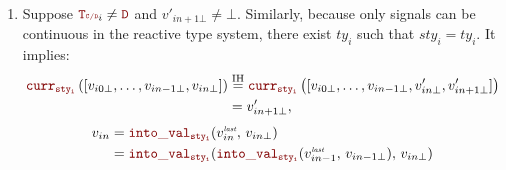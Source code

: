 \begin{skippableproof}
\begin{itemize}
\begin{enumerate}
\begin{align*}
                                                                                          & \qquad \text{\cf \Cref{lem:semantics:grfrp:theorems:oversampling:CurrVal:last}},
                        \end{align*}
                        then:
                        \begin{align*}
                            v'_{in+1} & = \intoVal{ty_i}{v'_{in}}{v'_{in+1\bot}}                               \\
                                      & = \intoVal{ty_i}{v'_{in}}{\bot}                                        \\
                                      & = \intoVal{ty_i}{\intoVal{ty_i}{v_{in}^{\explast}}{v'_{in\bot}}}{\bot} \\
                                      & = \intoVal{ty_i}{\intoVal{ty_i}{v_{in}^{\explast}}{v_{in\bot}}}{\bot}  \\
                                      & = \intoVal{ty_i}{v_{in}^{\explast}}{v_{in\bot}}                        \\
                                      & \qquad \text{\cf \Cref{rule:semantics:grfrp:opsem:aux:intoVal:signal}} \\
                                      & = v_{in}.
                        \end{align*}
                  \item Suppose $\rType_i \neq \dType$ and $v'_{in+1\bot} \neq \bot$. Similarly,
                        because only signals can be continuous in the reactive type system, there
                        exist $ty_i$ such that $sty_i = ty_i$. It implies:
                        \begin{align*}
                            \CurrVal{sty_i}{[v_{i0\bot}, \dots, v_{in-1\bot}, v_{in\bot}]} & \myeq{IH} \CurrVal{sty_i}{[v_{i0\bot}, \dots, v_{in-1\bot}, v'_{in\bot}, v'_{in+1\bot}]} \\
                                                                                           & = v'_{in+1\bot},
                        \end{align*}
                        \begin{align*}
                            v_{in} & = \intoVal{sty_i}{v_{in}^{\explast}}{v_{in\bot}}                                                     \\
                                   & = \intoVal{sty_i}{\intoVal{sty_i}{v_{in-1}^{\explast}}{v_{in-1\bot}}}{v_{in\bot}}                    \\

\end{align*}
\end{enumerate}
\end{itemize}
\end{skippableproof}
